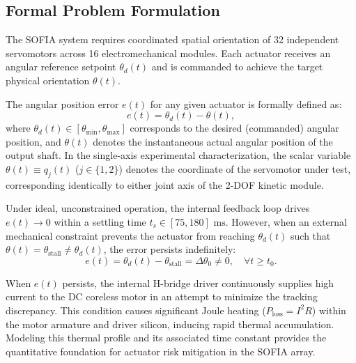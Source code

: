 \documentclass[lettersize,journal]{IEEEtran}
\begin{document}
	\subsection{Formal Problem Formulation}
	\label{sec:problem_formulation}
	
	The SOFIA system requires coordinated spatial orientation of 32 independent servomotors across 16 electromechanical modules. Each actuator receives an angular reference setpoint $\theta_d(t)$ and is commanded to achieve the target physical orientation $\theta(t)$.
	
	The angular position error $e(t)$ for any given actuator is formally defined as:
	\begin{equation}
		e(t) = \theta_d(t) - \theta(t),
		\label{eq:position_error}
	\end{equation}
	where $\theta_d(t) \in [\theta_{\min}, \theta_{\max}]$ corresponds to the desired (commanded) angular position, and $\theta(t)$ denotes the instantaneous actual angular position of the output shaft. In the single-axis experimental characterization, the scalar variable $\theta(t) \equiv q_j(t)$ ($j \in \{1, 2\}$) denotes the coordinate of the servomotor under test, corresponding identically to either joint axis of the 2-DOF kinetic module.
	
	Under ideal, unconstrained operation, the internal feedback loop drives $e(t) \to 0$ within a settling time $t_s \in [75, 180]\text{ ms}$. However, when an external mechanical constraint prevents the actuator from reaching $\theta_d(t)$ such that $\theta(t) = \theta_{\text{stall}} \neq \theta_d(t)$, the error persists indefinitely:
	\begin{equation}
		e(t) = \theta_d(t) - \theta_{\text{stall}} = \Delta\theta_0 \neq 0, \quad \forall t \ge t_0.
		\label{eq:persistent_error}
	\end{equation}
	
	When $e(t)$ persists, the internal H-bridge driver continuously supplies high current to the DC coreless motor in an attempt to minimize the tracking discrepancy. This condition causes significant Joule heating ($P_{\text{loss}} = I^2 R$) within the motor armature and driver silicon, inducing rapid thermal accumulation. Modeling this thermal profile and its associated time constant provides the quantitative foundation for actuator risk mitigation in the SOFIA array.
	
\end{document}
